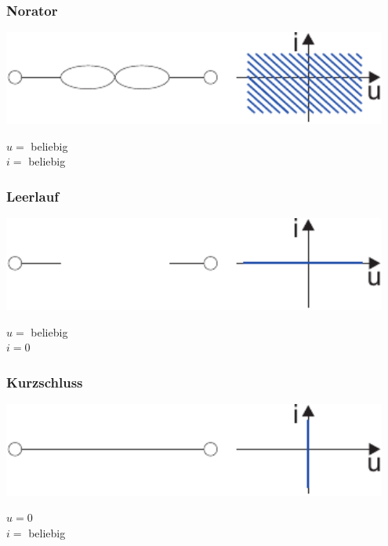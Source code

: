\documentclass[a4paper,twocolumn,10pt]{article}
\begin{document}
\subsubsection*{Norator}
\begin{minipage}[b]{0.26\textwidth}
\includegraphics[width=0.95\textwidth]{Grafiken/Norator}
\end{minipage}
\hfill
\begin{minipage}[b]{0.2\textwidth}
$u=$ beliebig\\
$i=$ beliebig
\end{minipage}

\subsubsection*{Leerlauf}
\begin{minipage}[b]{0.26\textwidth}
\includegraphics[width=0.95\textwidth]{Grafiken/Leerlauf}
\end{minipage}
\hfill
\begin{minipage}[b]{0.2\textwidth}
$u=$ beliebig\\
$i=0$
\end{minipage}

\subsubsection*{Kurzschluss}
\begin{minipage}[b]{0.26\textwidth}
\includegraphics[width=0.95\textwidth]{Grafiken/Kurzschluss}
\end{minipage}
\hfill
\begin{minipage}[b]{0.2\textwidth}
$u=0$\\
$i=$ beliebig
\end{minipage}
\end{document}
